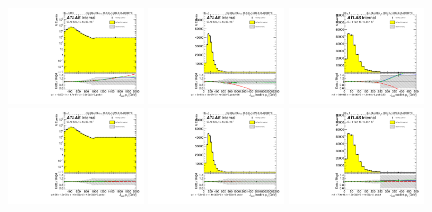 \begin{figure}[htbp!]
\begin{center}
\includegraphics[width=0.32\textwidth,angle=-90]{figures/boosted/Reweight/Fits/Moriond_bkg_3_NoTag_3Trk_lead_Incl_sublHCand_Pt_m_1.pdf}
\includegraphics[width=0.32\textwidth,angle=-90]{figures/boosted/Reweight/Fits/Moriond_bkg_3_NoTag_3Trk_lead_Incl_sublHCand_trk0_Pt.pdf}
\includegraphics[width=0.32\textwidth,angle=-90]{figures/boosted/Reweight/Fits/Moriond_bkg_3_NoTag_3Trk_lead_Incl_sublHCand_trk1_Pt.pdf} \\
\includegraphics[width=0.32\textwidth,angle=-90]{figures/boosted/Reweight/Fits/Moriond_bkg_9_NoTag_3Trk_lead_Incl_sublHCand_Pt_m_1.pdf}
\includegraphics[width=0.32\textwidth,angle=-90]{figures/boosted/Reweight/Fits/Moriond_bkg_9_NoTag_3Trk_lead_Incl_sublHCand_trk0_Pt.pdf}
\includegraphics[width=0.32\textwidth,angle=-90]{figures/boosted/Reweight/Fits/Moriond_bkg_9_NoTag_3Trk_lead_Incl_sublHCand_trk1_Pt.pdf} \\

\end{center}
\end{figure}
